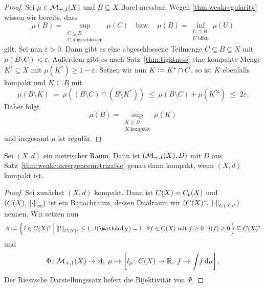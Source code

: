 \documentclass[../main/main.tex]{subfiles}
\begin{document}
	\begin{proof}
		Sei $\mu \in \mathcal{M}_{+,1}(X)$ und $B \subseteq X$ Borel-messbar. 
		Wegen \ref{thm:weakregularity} wissen wir bereits, dass 
		\[\mu(B) = \sup_{\substack{C \subseteq B \\ C \text{ abgeschlossen}}} \mu(C) 
			\quad \text{bzw.} \quad \mu(B) = \inf_{\substack{U \supseteq B \\ U \text{ offen}}} 
			\mu(U)\]
		gilt. Sei nun $\varepsilon > 0$. Dann gibt es eine abgeschlossene Teilmenge 
		$C \subseteq B \subseteq X$ mit $\mu(B \setminus C) < \varepsilon$. 
		Außerdem gibt es nach Satz~\ref{thm:tightness} eine kompakte Menge 
		$K^\ast \subseteq X$ mit $\mu(K^\ast) \geq 1 - \varepsilon$. Setzen 
		wir nun $K \vcentcolon = K^\ast \cap C$, so ist $K$ ebenfalls kompakt und 
		$K \subseteq B$ mit 
		\[ \mu(B \setminus K) 
			\; = \; \mu((B \setminus C) \cap (B \setminus K^\ast)) 
			\; \leq \; \mu(B \setminus C) + \mu(K^{\ast \mathsf{c}}) 
			\; \leq \; 2 \varepsilon \text{.} \]
		Daher folgt 
		\[\mu(B) 
			= \sup_{\substack{K \subseteq B \\ K \text{ kompakt}}} \mu(K)\] 
		und insgesamt $\mu$ ist regulär.
	\end{proof}

	\begin{Hilfssatz}
		Sei $(X, d)$ ein metrischer Raum. Dann ist $(\mathcal{M}_{+,1}(X), D)$ 
		mit $D$ aus Satz~\ref{thm:weakconvergencemetrizable} genau dann kompakt, 
		wenn $(X, d)$ kompakt ist.
	\end{Hilfssatz}

	\begin{proof}
		Sei zunächst $(X, d)$ kompakt. Dann ist $C(X) = C_b(X)$ und $(C(X), \left\lVert\cdot\right\rVert_\infty)$ ist ein Banachraum, dessen Dualraum wir 
		$(C(X)^\ast, \left\lVert\cdot\right\rVert_{C(X)^{\ast}})$ nennen.
		Wir setzen nun
		\[ A \defby \setcomp{l \in C(X)^\ast}{\norm{l}_{C(X)^\ast} \leq 1, \; l(\indfct_{X}) = 1, \; \forall f \in C(X) \text{ mit } f \geq 0 : l(f) \geq 0} \subseteq C(X)^\ast \]
		und
		\[ \Phi \colon \mathcal{M}_{+,1}(X) \to A, \; \mu \mapsto \left[l_\mu \colon C(X) \to \mathbb{R}, \; f \mapsto \int_{} \, f \, \mathrm{d}\mu \right]  \text{.} \]
		Der Rieszsche Darstellungssatz liefert die Bijektivität von $\Phi$.
	\end{proof}
	
\end{document}
